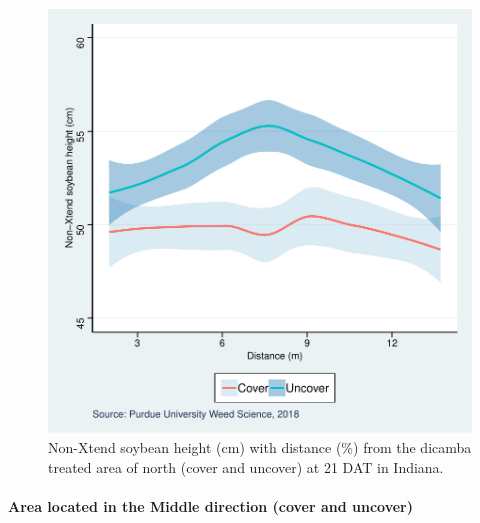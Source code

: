 \documentclass[]{article}
\let\oldparagraph\paragraph
\renewcommand{\paragraph}[1]{\oldparagraph{#1}\mbox{}}
\begin{document}
\begin{figure}
\centering
\includegraphics{Report_Dicamba_study_files/figure-latex/unnamed-chunk-36-1.pdf}
\caption{Non-Xtend soybean height (cm) with distance (\%) from the
dicamba treated area of north (cover and uncover) at 21 DAT in Indiana.}
\end{figure}

\pagebreak
\newpage

\paragraph{\texorpdfstring{Area located in the \textbf{Middle} direction
(cover and
uncover)}{Area located in the Middle direction (cover and uncover)}}\label{area-located-in-the-middle-direction-cover-and-uncover}
\end{document}
